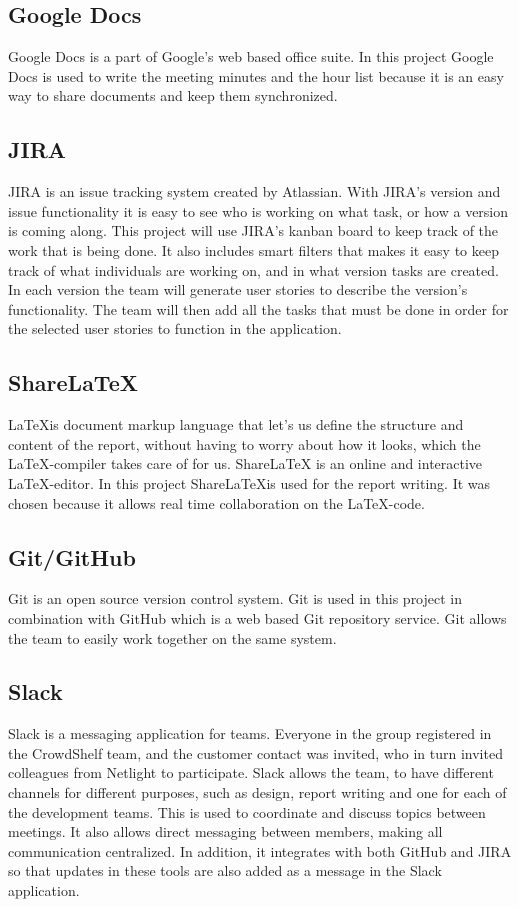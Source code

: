     \subsection{Google Docs}
    Google Docs is a part of Google's web based office suite.\cite{google-docs} In this project Google Docs is used to write the meeting minutes and the hour list because it is an easy way to share documents and keep them synchronized.
    \subsection{JIRA}
    JIRA is an issue tracking system created by Atlassian.\cite{jira} With JIRA's version and issue functionality it is easy to see who is working on what task, or how a version is coming along. This project will use JIRA's kanban board to keep track of the work that is being done.\cite[p. 137]{lean-startup} It also includes smart filters that makes it easy to keep track of what individuals are working on, and in what version tasks are created. In each version the team will generate user stories to describe the version's functionality. The team will then add all the tasks that must be done in order for the selected user stories to function in the application.
    
    \subsection{Share\LaTeX}
    \LaTeX is document markup language that let's us define the structure and content of the report, without having to worry about how it looks, which the \LaTeX-compiler takes care of for us.\cite{latex} ShareLaTeX is an online and interactive \LaTeX-editor.\cite{share-latex}
    In this project Share\LaTeX is used for the report writing. It was chosen because it allows real time collaboration on the \LaTeX-code.
    \subsection{Git/GitHub}
    Git is an open source version control system.\cite{git} Git is used in this project in combination with GitHub which is a web based Git repository service.\cite{git-hub} Git allows the team to easily work together on the same system.
    \subsection{Slack}
    \label{about-slack}
    Slack is a messaging application for teams.\cite{slack} Everyone in the group registered in the CrowdShelf team, and the customer contact was invited, who in turn invited colleagues from Netlight to participate. Slack allows the team, to have different channels for different purposes, such as design, report writing and one for each of the development teams. This is used to coordinate and discuss topics between meetings. It also allows direct messaging between members, making all communication centralized. In addition, it integrates with both GitHub and JIRA so that updates in these tools are also added as a message in the Slack application.

